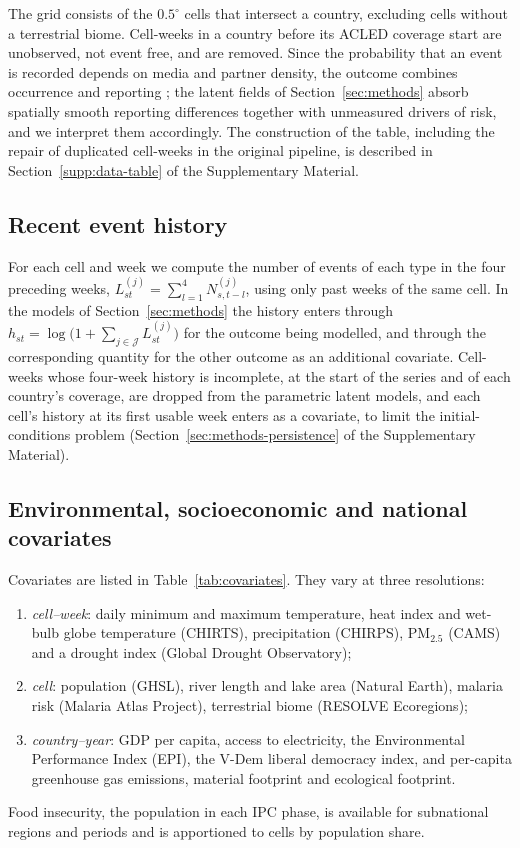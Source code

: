 The grid consists of the $0.5^\circ$ cells that intersect a country, excluding cells
without a terrestrial biome. Cell-weeks in a country before its ACLED coverage start
are unobserved, not event free, and are removed. Since the probability that an event
is recorded depends on media and partner density, the outcome combines occurrence
and reporting \citep{weidmann2016closer}; the latent fields of
Section~\ref{sec:methods} absorb spatially smooth reporting differences together with
unmeasured drivers of risk, and we interpret them accordingly. The construction of the
table, including the repair of duplicated cell-weeks in the original pipeline, is
described in Section~\ref{supp:data-table} of the Supplementary Material.

\subsection{Recent event history}\label{sec:data-history}

For each cell and week we compute the number of events of each type in the four
preceding weeks, $L^{(j)}_{st} = \sum_{l=1}^{4} N^{(j)}_{s,t-l}$, using only past
weeks of the same cell. In the models of Section~\ref{sec:methods} the history enters
through $h_{st} = \log\bigl(1 + \sum_{j \in \mathcal{J}} L^{(j)}_{st}\bigr)$ for the
outcome being modelled, and through the corresponding quantity for the other outcome
as an additional covariate. Cell-weeks whose four-week history is incomplete, at the
start of the series and of each country's coverage, are dropped from the parametric
latent models, and each cell's history at its first usable week enters as a
covariate, to limit the initial-conditions problem (Section~\ref{sec:methods-persistence}
of the Supplementary Material).

\subsection{Environmental, socioeconomic and national covariates}\label{sec:data-cov}

Covariates are listed in Table~\ref{tab:covariates}. They vary at three
resolutions:
\begin{enumerate}
\item \emph{cell--week}: daily minimum and maximum temperature, heat index and
wet-bulb globe temperature (CHIRTS), precipitation (CHIRPS), PM$_{2.5}$ (CAMS) and a
drought index (Global Drought Observatory);
\item \emph{cell}: population (GHSL), river length and lake area (Natural Earth),
malaria risk (Malaria Atlas Project), terrestrial biome (RESOLVE Ecoregions);
\item \emph{country--year}: GDP per capita, access to electricity, the
Environmental Performance Index (EPI), the V-Dem liberal democracy index, and
per-capita greenhouse gas emissions, material footprint and ecological footprint.
\end{enumerate}
Food insecurity, the population in each IPC phase, is available for subnational
regions and periods and is apportioned to cells by population share.

